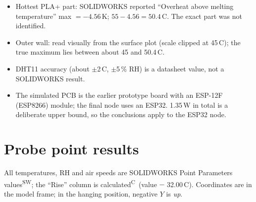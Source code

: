 \documentclass[11pt,a4paper]{article}
\newcommand{\SW}{\textsuperscript{SW}}
\newcommand{\CALC}{\textsuperscript{C}}
\begin{document}
\small
\begin{itemize}
\item Hottest PLA+ part: SOLIDWORKS reported ``Overheat above melting temperature'' max $=-4.56$\,K;
      $55-4.56=50.4$\,\textdegree C. The exact part was not identified.
\item Outer wall: read visually from the surface plot (scale clipped at 45\,\textdegree C); the true
      maximum lies between about 45 and 50.4\,\textdegree C.
\item DHT11 accuracy (about $\pm$2\,\textdegree C, $\pm$5\,\% RH) is a datasheet value, not a SOLIDWORKS result.
\item The simulated PCB is the earlier prototype board with an ESP-12F (ESP8266) module; the final node uses an ESP32. 1.35\,W in total is a deliberate upper bound, so the conclusions apply to the ESP32 node.
\end{itemize}
\normalsize

\section{Probe point results}
All temperatures, RH and air speeds are SOLIDWORKS Point Parameters values\SW; the ``Rise'' column is calculated\CALC\ (value $-$ 32.00\,\textdegree C).
Coordinates are in the model frame; in the hanging position, negative $Y$ is \emph{up}.
\end{document}
